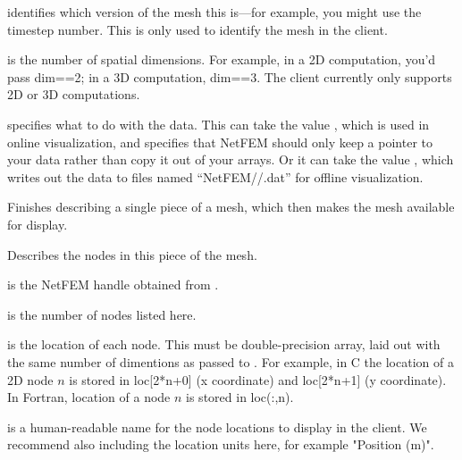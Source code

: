 \documentclass[10pt]{article}
\begin{document}
 identifies which version of the mesh this is---for example,
you might use the timestep number.  This is only used to identify the
mesh in the client.

 is the number of spatial dimensions.  For example, in a 2D
computation, you'd pass dim==2; in a 3D computation, dim==3.
The client currently only supports 2D or 3D computations.

 specifies what to do with the data.  This can
take the value , which is used in online visualization,
and specifies that NetFEM should only keep a pointer to your data 
rather than copy it out of your arrays.  Or it can take the value
, which writes out the data to files named
``NetFEM//.dat'' for offline visualization. 



Finishes describing a single piece of a mesh, which 
then makes the mesh available for display.



Describes the nodes in this piece of the mesh.

 is the NetFEM handle obtained from .

 is the number of nodes listed here.

 is the location of each node.  This must be double-precision
array, laid out with the same number of dimentions as passed to 
.  For example, in C the location of a 2D
node $n$ is stored in loc[2*n+0] (x coordinate) and loc[2*n+1]
(y coordinate).  In Fortran, location of a node $n$ is stored 
in loc(:,n).

 is a human-readable name for the node locations
to display in the client.  We recommend also including the location
units here, for example "Position (m)".


\end{document}

